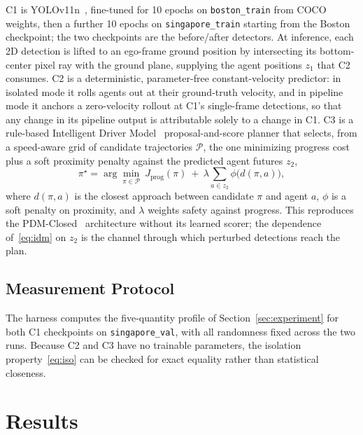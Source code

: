 \documentclass[conference]{IEEEtran}
\begin{document}
C1 is YOLOv11n~\cite{jocher2024yolo11}, fine-tuned for 10 epochs on
\texttt{boston\_train} from COCO weights, then a further 10 epochs on
\texttt{singapore\_train} starting from the Boston checkpoint; the two
checkpoints are the before/after detectors. At inference, each 2D detection is
lifted to an ego-frame ground position by intersecting its bottom-center pixel
ray with the ground plane, supplying the agent positions $z_1$ that C2
consumes. C2 is a deterministic, parameter-free constant-velocity predictor:
in isolated mode it rolls agents out at their ground-truth velocity, and in
pipeline mode it anchors a zero-velocity rollout at C1's single-frame
detections, so that any change in its pipeline output is attributable solely to
a change in C1.
C3 is a rule-based Intelligent Driver Model~\cite{treiber2000idm}
proposal-and-score planner that selects, from a speed-aware grid of candidate
trajectories $\mathcal{P}$, the one minimizing progress cost plus a soft
proximity penalty against the predicted agent futures $z_2$,
\begin{equation}
\pi^{\star} = \arg\min_{\pi \in \mathcal{P}}\
J_{\text{prog}}(\pi)
\ +\ \lambda \!\!\sum_{a \in z_2} \phi\bigl(d(\pi, a)\bigr),
\label{eq:idm}
\end{equation}
where $d(\pi,a)$ is the closest approach between candidate $\pi$ and agent $a$,
$\phi$ is a soft penalty on proximity, and $\lambda$ weights safety against
progress. This reproduces the PDM-Closed~\cite{dauner2023parting} architecture
without its learned scorer; the dependence of~\eqref{eq:idm} on $z_2$ is the
channel through which perturbed detections reach the plan.

\subsection{Measurement Protocol}
The harness computes the five-quantity profile of Section~\ref{sec:experiment}
for both C1 checkpoints on \texttt{singapore\_val}, with all randomness fixed
across the two runs. Because C2 and C3 have no trainable parameters, the
isolation property~\eqref{eq:iso} can be checked for exact equality rather than
statistical closeness.

\section{Results}
\label{sec:results}
\end{document}
